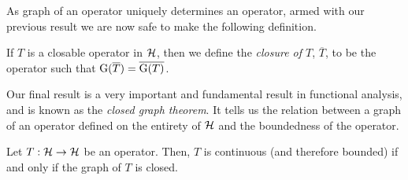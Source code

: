 As graph of an operator uniquely determines an operator, armed with our previous result we are now safe to make the following definition.

\begin{definition}
  If $T$ is a closable operator in $\mathcal{H}$, then we define the {\emph{closure of $T$}}, $\overline{T}$, to be the operator such that $\operatorname{G}(\overline{T}) = \overline{\operatorname{G}(T)}$.
\end{definition}

Our final result is a very important and fundamental result in functional analysis, and is known as the {\emph{closed graph theorem}}. It tells us the relation between a graph of an operator defined on the entirety of $\mathcal{H}$ and the boundedness of the operator.

\begin{theorem}\label{lbl_thrm_closed_graph}
  Let $T: \mathcal{H} \to \mathcal{H}$ be an operator. Then, $T$ is continuous (and therefore bounded) if and only if the graph of $T$ is closed.
\end{theorem}
